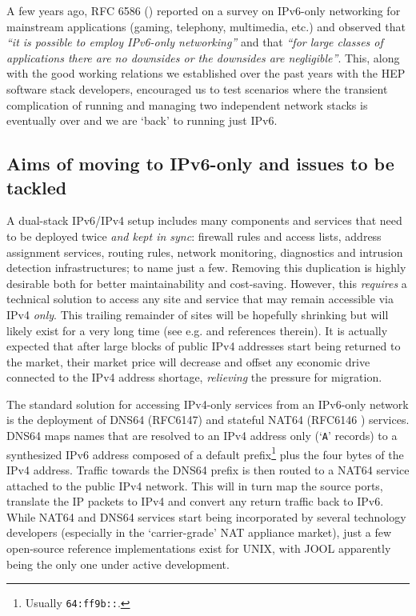 
A few years ago, RFC 6586 (\cite{rfc}) reported on a survey on IPv6-only
networking for mainstream applications (gaming, telephony,
multimedia, etc.) and observed that {\it  ``it is possible to employ IPv6-only
networking''} and that {\it ``for large classes of applications
there are no downsides or the downsides are negligible''}.
This, along with the good working relations we established over
the past years with the HEP software stack developers,
encouraged us to test 
scenarios where the transient complication of running and managing
two independent network stacks is eventually over and we are `back' to
running just IPv6.

\subsection{Aims of moving to IPv6-only and issues to be tackled}
\label{ssec:ipv6onlymove}
A dual-stack IPv6/IPv4 setup includes many components and services that need
to be deployed twice {\it and kept in sync}: firewall rules and access
lists, address assignment services, routing rules, network monitoring,
diagnostics and
intrusion detection infrastructures; to name just a few.
Removing this duplication is highly desirable both for better maintainability
and cost-saving.
However, this {\it requires} a technical
solution to access any site and service that may remain accessible via IPv4
{\it only}.
This trailing remainder of sites will be hopefully
shrinking but will likely exist for a very long time (see
e.g. \cite{ipv6trans} and references therein).
It is actually expected that after large blocks of public IPv4
addresses start being returned to the market, their market price will
decrease and offset any economic drive connected to the IPv4 address shortage,
{\it relieving} the pressure for migration.\par

The standard solution for accessing IPv4-only services from an IPv6-only
network is the deployment of DNS64 (RFC6147) and stateful
NAT64 (RFC6146 \cite{rfc}) services. DNS64 maps names that are resolved to
an IPv4 address only (`{\tt A}' records) to a synthesized IPv6 address composed
of a default prefix\footnote{Usually {\tt 64:ff9b::}.} plus the four bytes of
the IPv4 address. Traffic towards the DNS64 prefix is then routed to
a NAT64 service attached to the public IPv4 network. This will in turn map the
source ports, translate the IP packets to IPv4 and convert any return traffic
back to IPv6. While NAT64 and DNS64 services start being incorporated by
several technology developers (especially in the `carrier-grade' NAT 
appliance market),
just a few open-source reference implementations exist for UNIX, with
JOOL \cite{jool} apparently being the only one 
under active development.\par

